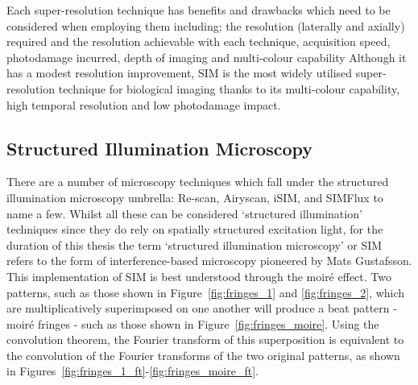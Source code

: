 Each super-resolution technique has benefits and drawbacks which 
need to be considered when employing them including; the resolution 
(laterally and axially) required and the resolution achievable with each 
technique, acquisition speed, photodamage incurred, depth of imaging and 
multi-colour capability\cite{hell20152015,schermelleh2019super} Although it 
has a modest resolution improvement, SIM is the most widely utilised
super-resolution technique for biological imaging thanks to its multi-colour capability,
high temporal resolution and low photodamage impact\cite{leung2011review}.

\subsection{Structured Illumination Microscopy}
\label{subsec:SIM}

There are a number of microscopy techniques which fall under the structured
illumination microscopy umbrella: Re-scan\cite{de2013re}, 
Airyscan\cite{huff2015airyscan}, iSIM\cite{york2013instant,curd2015construction},
and SIMFlux\cite{cnossen2020localization} to name a few. Whilst all these can be 
considered `structured illumination' techniques since they do rely on spatially 
structured excitation light, for the duration of this thesis the term 
`structured illumination microscopy' or SIM refers to the form of 
interference-based microscopy pioneered by Mats 
Gustafsson\cite{heintzmann1999laterally,gustafsson1999extended,gustafsson2000surpassing,gustafsson2008three}.
This implementation of SIM is best understood through the moir\'{e} effect.
Two patterns, such as those shown in Figure~\ref{fig:fringes_1} and 
\ref{fig:fringes_2}, which are multiplicatively superimposed on one another
will produce a beat pattern - moir\'{e} fringes - such as those shown in
Figure~\ref{fig:fringes_moire}. Using the convolution theorem, the Fourier
transform of this superposition is equivalent to the convolution of the 
Fourier transforms of the two original patterns\cite{mcgillem1991continuous},
as shown in Figures~\ref{fig:fringes_1_ft}-\ref{fig:fringes_moire_ft}. 

